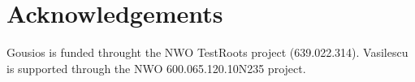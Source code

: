 
\section{Acknowledgements}
\label{sec:acknowledgements}

Gousios is funded throught the NWO TestRoots project (639.022.314).
Vasilescu is supported through the NWO 600.065.120.10N235 project.
